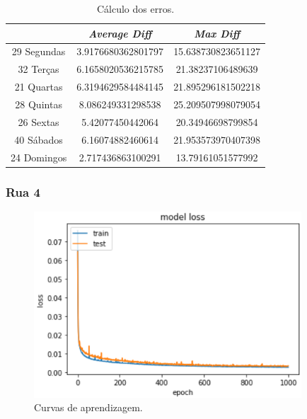 \documentclass[a4paper, 12pt]{article}
\begin{document}
\begin{table}[H]
	\centering
	\begin{tabular}{||c||c|c||}
		\hline\hline
		& \textit{Average Diff} & \textit{Max Diff} \\
		\hline\hline
		29 Segundas & 3.9176680362801797

 & 15.638730823651127\\
		\hline
		32 Terças  &

6.1658020536215785 & 21.38237106489639 \\
		\hline
		21 Quartas & 6.3194629584484145

 & 21.895296181502218 \\
		\hline
		28 Quintas  & 
8.086249331298538
 & 25.209507998079054\\
		\hline
		26 Sextas & 
5.42077450442064 &20.34946698799854 \\
		\hline
		40 Sábados  & 6.16074882460614
& 21.953573970407398 \\
		\hline
		24 Domingos & 
2.717436863100291
 & 13.79161051577992
 \\
		\hline\hline
	\end{tabular}
	\label{table:mod3_rua4}
	\caption{Cálculo dos erros.}
\end{table}

\subsubsection{Rua 4}

\begin{figure}[H]
	\centering
	\includegraphics[width=10cm]{resultados/curvas_aprend_4.png}
	\caption{Curvas de aprendizagem.}
\end{figure}
\end{document}
